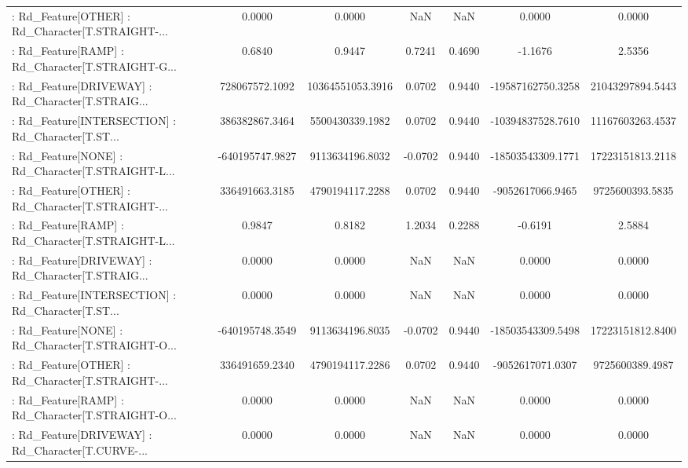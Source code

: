 \begin{longtable}{p{4cm}cccccc}
 : Rd\_Feature[OTHER] : Rd\_Character[T.STRAIGHT-... &            0.0000 &            0.0000 &     NaN &          NaN &             0.0000 &            0.0000 \\
 : Rd\_Feature[RAMP] : Rd\_Character[T.STRAIGHT-G... &            0.6840 &            0.9447 &  0.7241 &       0.4690 &            -1.1676 &            2.5356 \\
 : Rd\_Feature[DRIVEWAY] : Rd\_Character[T.STRAIG... &    728067572.1092 &  10364551053.3916 &  0.0702 &       0.9440 &  -19587162750.3258 &  21043297894.5443 \\
 : Rd\_Feature[INTERSECTION] : Rd\_Character[T.ST... &    386382867.3464 &   5500430339.1982 &  0.0702 &       0.9440 &  -10394837528.7610 &  11167603263.4537 \\
 : Rd\_Feature[NONE] : Rd\_Character[T.STRAIGHT-L... &   -640195747.9827 &   9113634196.8032 & -0.0702 &       0.9440 &  -18503543309.1771 &  17223151813.2118 \\
 : Rd\_Feature[OTHER] : Rd\_Character[T.STRAIGHT-... &    336491663.3185 &   4790194117.2288 &  0.0702 &       0.9440 &   -9052617066.9465 &   9725600393.5835 \\
 : Rd\_Feature[RAMP] : Rd\_Character[T.STRAIGHT-L... &            0.9847 &            0.8182 &  1.2034 &       0.2288 &            -0.6191 &            2.5884 \\
 : Rd\_Feature[DRIVEWAY] : Rd\_Character[T.STRAIG... &            0.0000 &            0.0000 &     NaN &          NaN &             0.0000 &            0.0000 \\
 : Rd\_Feature[INTERSECTION] : Rd\_Character[T.ST... &            0.0000 &            0.0000 &     NaN &          NaN &             0.0000 &            0.0000 \\
 : Rd\_Feature[NONE] : Rd\_Character[T.STRAIGHT-O... &   -640195748.3549 &   9113634196.8035 & -0.0702 &       0.9440 &  -18503543309.5498 &  17223151812.8400 \\
 : Rd\_Feature[OTHER] : Rd\_Character[T.STRAIGHT-... &    336491659.2340 &   4790194117.2286 &  0.0702 &       0.9440 &   -9052617071.0307 &   9725600389.4987 \\
 : Rd\_Feature[RAMP] : Rd\_Character[T.STRAIGHT-O... &            0.0000 &            0.0000 &     NaN &          NaN &             0.0000 &            0.0000 \\
 : Rd\_Feature[DRIVEWAY] : Rd\_Character[T.CURVE-... &            0.0000 &            0.0000 &     NaN &          NaN &             0.0000 &            0.0000 \\

\end{longtable}
